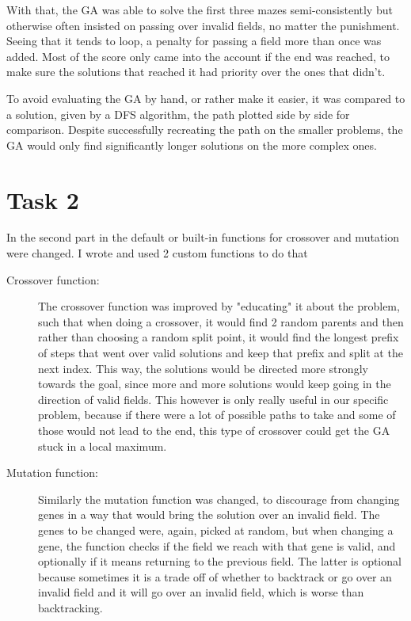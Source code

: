 \documentclass{article}
\begin{document}
\begin{description}
With that, the GA was able to solve the first three mazes semi-consistently but otherwise often insisted on passing over invalid fields, no matter the punishment. Seeing that it tends to loop, a penalty for passing a field more than once was added. Most of the score only came into the account if the end was reached, to make sure the solutions that reached it had priority over the ones that didn't. 

To avoid evaluating the GA by hand, or rather make it easier, it was compared to a solution, given by a DFS algorithm, the path plotted side by side for comparison. Despite successfully recreating the path on the smaller problems, the GA would only find significantly longer solutions on the more complex ones.
\newpage
\section{Task 2}
In the second part in the default or built-in functions for crossover and mutation were changed. I wrote and used 2 custom functions to do that

\begin{description}

    \item[Crossover function:] 
        The crossover function was improved by "educating" it about the problem, such that when doing a crossover, it would find 2 random parents and then rather than choosing a random split point, it would find the longest prefix of steps that went over valid solutions and keep that prefix and split at the next index. This way, the solutions would be directed more strongly towards the goal, since more and more solutions would keep going in the direction of valid fields. This however is only really useful in our specific problem, because if there were a lot of possible paths to take and some of those would not lead to the end, this type of crossover could get the GA stuck in a local maximum. 

    \item[Mutation function:]
        Similarly the mutation function was changed, to discourage from changing genes in a way that would bring the solution over an invalid field. The genes to be changed were, again, picked at random, but when changing a gene, the function checks if the field we reach with that gene is valid, and optionally if it means returning to the previous field. The latter is optional because sometimes it is a trade off of whether to backtrack or go over an invalid field and it will go over an invalid field, which is worse than backtracking. 
        

\end{description}
\end{description}
\end{document}
